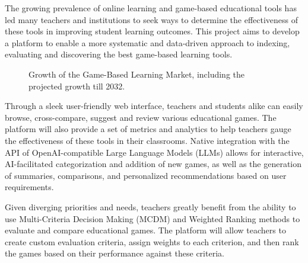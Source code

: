 \documentclass[11pt,italian,a4paper]{article}
\begin{document}
The growing prevalence of online learning and game-based educational tools has led many teachers and institutions to seek ways to determine the effectiveness of these tools in improving student learning outcomes. This project aims to develop a platform to enable a more systematic and data-driven approach to indexing, evaluating and discovering the best game-based learning tools.


\begin{figure}[h]
    \centering
    \caption{Growth of the Game-Based Learning Market, including the projected growth till 2032.}
\end{figure}

Through a sleek user-friendly web interface, teachers and students alike can easily browse, cross-compare, suggest and review various educational games. The platform will also provide a set of metrics and analytics to help teachers gauge the effectiveness of these tools in their classrooms. Native integration with the API of OpenAI-compatible Large Language Models (LLMs) allows for interactive, AI-facilitated categorization and addition of new games, as well as the generation of summaries, comparisons, and personalized recommendations based on user requirements.

Given diverging priorities and needs, teachers greatly benefit from the ability to use Multi-Criteria Decision Making (MCDM) and Weighted Ranking methods to evaluate and compare educational games. The platform will allow teachers to create custom evaluation criteria, assign weights to each criterion, and then rank the games based on their performance against these criteria.
\end{document}

